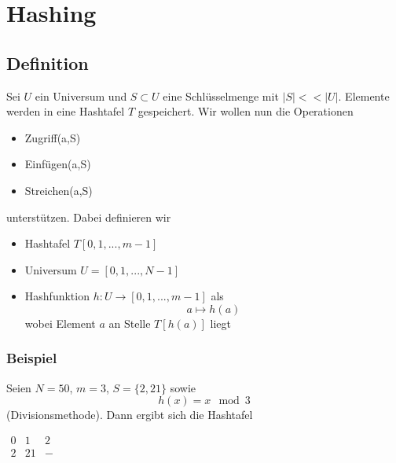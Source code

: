 %

\chapter{Hashing} 
    \section{Definition}
        Sei $U$ ein Universum und $S \subset U$ eine Schlüsselmenge mit $|S|<<|U|$. Elemente werden in eine Hashtafel $T$ gespeichert. 
        Wir wollen nun die Operationen 
        \begin{itemize}
            \item Zugriff(a,S)
            \item Einfügen(a,S)
            \item Streichen(a,S)
        \end{itemize}
        unterstützen. Dabei definieren wir
        \begin{itemize}
            \item Hashtafel $T[0,1,...,m-1]$
            \item Universum $U=[0,1,...,N-1]$
            \item Hashfunktion $h: U \rightarrow [0,1,...,m-1]$ als 
                $$
                    a \mapsto h(a)
                $$
                wobei Element $a$ an Stelle $T[h(a)]$ liegt
        \end{itemize}
        
        \subsection{Beispiel}
            Seien $N=50$, $m=3$, $S= \{2,21\}$ sowie 
            $$
                h(x) = x \mod 3
            $$
            (Divisionsmethode). Dann ergibt sich die Hashtafel
            
            \begin{math}
            	\begin{array}{c|c|c}
            		0&1&2\\\hline
            		2&21&-           	
            	\end{array}
            \end{math}
            
